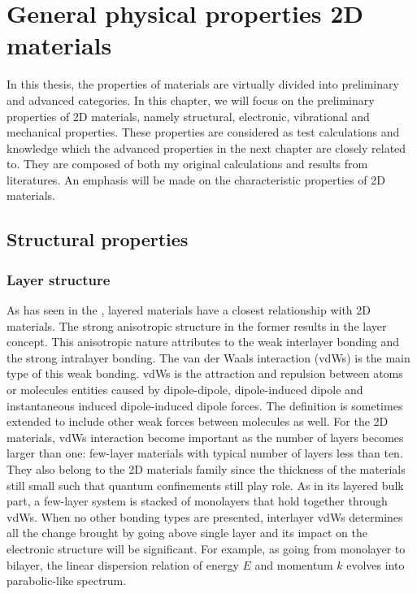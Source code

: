
\chapter{General physical properties 2D materials \label{chap:3}}

\ifpdf
    \graphicspath{{Chapter3/Figs/Raster/}{Chapter3/Figs/PDF/}{Chapter3/Figs/}{Chapter3/Figs/Vector/}}
\else
    \graphicspath{{Chapter3/Figs/Vector/}{Chapter3/Figs/}}
\fi

In this thesis, the properties of materials are virtually divided into preliminary and advanced categories. In this chapter, we will focus on the preliminary properties of 2D materials, namely structural, electronic, vibrational and mechanical properties. These properties are considered as test calculations and knowledge which the advanced properties in the next chapter are closely related to. They are composed of both my original calculations and results from literatures. An emphasis will be made on the characteristic properties of 2D materials.

\section{Structural properties}
\subsection{Layer structure}

As has seen in the , layered materials have a closest relationship with 2D materials. The strong anisotropic structure in the former results in the layer concept. This anisotropic nature attributes to the weak interlayer bonding and the strong intralayer bonding. The van der Waals interaction (vdWs)\cite{vdws} is the main type of this weak bonding. vdWs is the attraction and repulsion between atoms or molecules entities caused by dipole-dipole, dipole-induced dipole and instantaneous induced dipole-induced dipole forces. The definition is sometimes extended to include other weak forces between molecules as well.  For the 2D materials, vdWs interaction become important as the number of layers becomes larger than one: few-layer materials with typical number of layers less than ten. They also belong to the 2D materials family since the thickness of the materials still small such that quantum confinements still play role. As in its layered bulk part, a few-layer system is stacked of monolayers that hold together through vdWs. When no other bonding types are presented, interlayer vdWs determines all the change brought by going above single layer and its impact on the electronic structure will be significant. For example, as going from monolayer to bilayer, the linear dispersion relation of energy $E$ and momentum $k$ evolves into parabolic-like spectrum\cite{Partoens2006,Mak2010}. 

